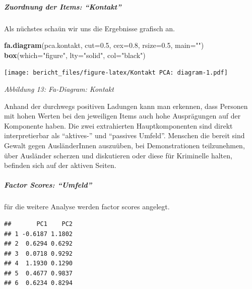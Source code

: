 \documentclass[]{article}
\newenvironment{Shaded}{\begin{snugshade}}{\end{snugshade}}
\newcommand{\KeywordTok}[1]{\textcolor[rgb]{0.13,0.29,0.53}{\textbf{{#1}}}}
\newcommand{\DataTypeTok}[1]{\textcolor[rgb]{0.13,0.29,0.53}{{#1}}}
\newcommand{\DecValTok}[1]{\textcolor[rgb]{0.00,0.00,0.81}{{#1}}}
\newcommand{\FloatTok}[1]{\textcolor[rgb]{0.00,0.00,0.81}{{#1}}}
\newcommand{\StringTok}[1]{\textcolor[rgb]{0.31,0.60,0.02}{{#1}}}
\newcommand{\NormalTok}[1]{{#1}}
\let\oldsubparagraph\subparagraph
\renewcommand{\subparagraph}[1]{\oldsubparagraph{#1}\mbox{}}
\begin{document}
\subparagraph{\texorpdfstring{Zuordnung der Items:
``Kontakt''}{Zuordnung der Items: Kontakt}}\label{zuordnung-der-items-kontakt}

Als nüchstes schaün wir uns die Ergebnisse grafisch an.

\begin{Shaded}
\begin{Highlighting}[]
\KeywordTok{fa.diagram}\NormalTok{(pca.kontakt, }\DataTypeTok{cut=}\FloatTok{0.5}\NormalTok{, }\DataTypeTok{cex=}\FloatTok{0.8}\NormalTok{, }\DataTypeTok{rsize=}\FloatTok{0.5}\NormalTok{, }\DataTypeTok{main=}\StringTok{""}\NormalTok{)}
\KeywordTok{box}\NormalTok{(}\DataTypeTok{which=}\StringTok{"figure"}\NormalTok{, }\DataTypeTok{lty=}\StringTok{"solid"}\NormalTok{, }\DataTypeTok{col=}\StringTok{"black"}\NormalTok{)}
\end{Highlighting}
\end{Shaded}

\texttt{[image: bericht\_files/figure-latex/Kontakt PCA: diagram-1.pdf]}

\begin{center}
\textit{Abbildung 13: Fa-Diagram: Kontakt}
\bigskip
\end{center}

Anhand der durchwegs positiven Ladungen kann man erkennen, dass Personen
mit hohen Werten bei den jeweiligen Items auch hohe Ausprägungen auf der
Komponente haben. Die zwei extrahierten Hauptkomponenten sind direkt
interpretierbar als ``aktives-'' und ``passives Umfeld''. Menschen die
bereit sind Gewalt gegen AusländerInnen auszuüben, bei Demonstrationen
teilzunehmen, über Ausländer scherzen und diskutieren oder diese für
Kriminelle halten, befinden sich auf der aktiven Seiten.

\subparagraph{\texorpdfstring{Factor Scores:
``Umfeld''}{Factor Scores: Umfeld}}\label{factor-scores-umfeld-1}

für die weitere Analyse werden factor scores angelegt.

\begin{Shaded}
\end{Shaded}

\begin{verbatim}
##       PC1    PC2
## 1 -0.6187 1.1802
## 2  0.6294 0.6292
## 3  0.0718 0.9292
## 4  1.1930 0.1290
## 5  0.4677 0.9837
## 6  0.6234 0.8294
\end{verbatim}
\end{document}

